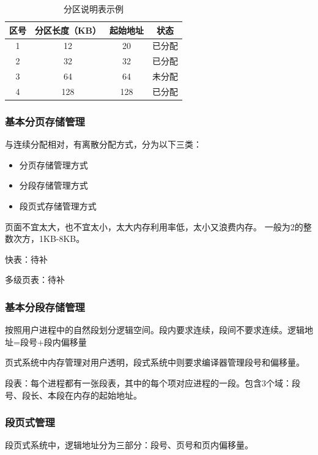 \documentclass[12pt, a4paper, oneside]{ctexart}
\begin{document}
\begin{table}[!ht]
  \centering
  \caption{分区说明表示例}
  \label{area_table_example}
  \begin{tabular}{|c|c|c|c|}
  \hline
    \textbf{区号} & \textbf{分区长度（KB）} & \textbf{起始地址} & \textbf{状态} \\ \hline
    1 & 12 & 20 & 已分配 \\ \hline
    2 & 32 & 32 & 已分配 \\ \hline
    3 & 64 & 64 & 未分配 \\ \hline
    4 & 128 & 128 & 已分配 \\ \hline
  \end{tabular}
\end{table}

\subsubsection{基本分页存储管理}

与连续分配相对，有离散分配方式，分为以下三类：
\begin{itemize}
  \item 分页存储管理方式
  \item 分段存储管理方式
  \item 段页式存储管理方式
\end{itemize}

页面不宜太大，也不宜太小，太大内存利用率低，太小又浪费内存。
一般为2的整数次方，1KB-8KB。

快表：待补

多级页表：待补

\subsubsection{基本分段存储管理}

按照用户进程中的自然段划分逻辑空间。段内要求连续，段间不要求连续。逻辑地址=段号+段内偏移量

页式系统中内存管理对用户透明，段式系统中则要求编译器管理段号和偏移量。

段表：每个进程都有一张段表，其中的每个项对应进程的一段。包含3个域：段号、段长、本段在内存的起始地址。

\subsubsection{段页式管理}

段页式系统中，逻辑地址分为三部分：段号、页号和页内偏移量。
\end{document}
